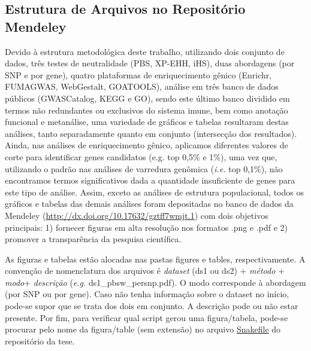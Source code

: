
\clearpage
\subsection{Estrutura de Arquivos no Repositório Mendeley}

Devido à estrutura metodológica deste trabalho, utilizando dois conjunto de dados, três testes de neutralidade (PBS, XP-EHH, iHS), duas abordagens (por SNP e por gene), quatro plataformas de enriquecimento gênico (Enrichr, FUMAGWAS, WebGestalt, GOATOOLS), análise em três banco de dados públicos (GWASCatalog, KEGG e GO), sendo este último banco dividido em termos não redundantes ou exclusivos do sistema imune, bem como anotação funcional e metanálise, uma variedade de gráficos e tabelas resultaram destas análises, tanto separadamente quanto em conjunto (intersecção dos resultados). Ainda, nas análises de enriquecimento gênico, aplicamos diferentes valores de corte para identificar genes candidatos (e.g. top 0,5\% e 1\%), uma vez que, utilizando o padrão nas análises de varredura genômica (\emph{i.e.} top 0,1\%), não encontramos termos significativos dada a quantidade insuficiente de genes para este tipo de análise. Assim, exceto as análises de estrutura populacional, todos os gráficos e tabelas das demais análises foram depositadas no banco de dados da Mendeley (\url{http://dx.doi.org/10.17632/gztff7wmjt.1}) com dois objetivos principais: 1) fornecer figuras em alta resolução nos formatos .png e .pdf e 2) promover a transparência da pesquisa científica.

As figuras e tabelas estão alocadas nas pastas figures e tables, respectivamente. A convenção de nomenclatura dos arquivos é \textsl{dataset} (ds1 ou ds2) + \textsl{método} + \textsl{modo}+ \textsl{descrição} (\emph{e.g.} ds1\_pbsw\_persnp.pdf). O modo corresponde à abordagem (por SNP ou por gene). Caso não tenha informação sobre o dataset no início, pode-se supor que se trata dos dois em conjunto. A descrição pode ou não estar presente. Por fim, para verificar qual script gerou uma figura/tabela, pode-se procurar pelo nome da figura/table (sem extensão) no arquivo \href{https://github.com/cmcouto-silva/tese/blob/main/Snakefile}{Snakefile} do repositório da tese.




